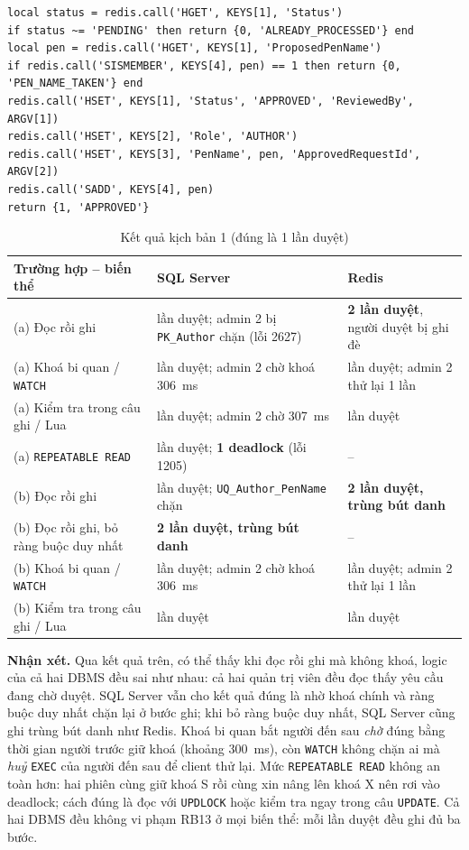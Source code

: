 \begin{verbatim}
local status = redis.call('HGET', KEYS[1], 'Status')
if status ~= 'PENDING' then return {0, 'ALREADY_PROCESSED'} end
local pen = redis.call('HGET', KEYS[1], 'ProposedPenName')
if redis.call('SISMEMBER', KEYS[4], pen) == 1 then return {0, 'PEN_NAME_TAKEN'} end
redis.call('HSET', KEYS[1], 'Status', 'APPROVED', 'ReviewedBy', ARGV[1])
redis.call('HSET', KEYS[2], 'Role', 'AUTHOR')
redis.call('HSET', KEYS[3], 'PenName', pen, 'ApprovedRequestId', ARGV[2])
redis.call('SADD', KEYS[4], pen)
return {1, 'APPROVED'}
\end{verbatim}

\begin{table}[H]
\centering\small
\begin{tabularx}{\textwidth}{|>{\raggedright\arraybackslash}p{4.6cm}|>{\raggedright\arraybackslash}X|>{\raggedright\arraybackslash}X|}
\hline
\textbf{Trường hợp -- biến thể} & \textbf{SQL Server} & \textbf{Redis} \\ \hline
(a) Đọc rồi ghi & 1 lần duyệt; admin 2 bị \texttt{PK\_Author} chặn (lỗi 2627) & \textbf{2 lần duyệt}, người duyệt bị ghi đè \\ \hline
(a) Khoá bi quan / \texttt{WATCH} & 1 lần duyệt; admin 2 chờ khoá 306~ms & 1 lần duyệt; admin 2 thử lại 1 lần \\ \hline
(a) Kiểm tra trong câu ghi / Lua & 1 lần duyệt; admin 2 chờ 307~ms & 1 lần duyệt \\ \hline
(a) \texttt{REPEATABLE READ} & 1 lần duyệt; \textbf{1 deadlock} (lỗi 1205) & -- \\ \hline
(b) Đọc rồi ghi & 1 lần duyệt; \texttt{UQ\_Author\_PenName} chặn & \textbf{2 lần duyệt, trùng bút danh} \\ \hline
(b) Đọc rồi ghi, bỏ ràng buộc duy nhất & \textbf{2 lần duyệt, trùng bút danh} & -- \\ \hline
(b) Khoá bi quan / \texttt{WATCH} & 1 lần duyệt; admin 2 chờ khoá 306~ms & 1 lần duyệt; admin 2 thử lại 1 lần \\ \hline
(b) Kiểm tra trong câu ghi / Lua & 1 lần duyệt & 1 lần duyệt \\ \hline
\end{tabularx}
\caption{Kết quả kịch bản 1 (đúng là 1 lần duyệt)}
\label{tab:tx-t1}
\end{table}

\textbf{Nhận xét.} Qua kết quả trên, có thể thấy khi đọc rồi ghi mà không khoá, logic của cả hai DBMS đều sai như nhau: cả hai quản trị viên đều đọc thấy yêu cầu đang chờ duyệt. SQL Server vẫn cho kết quả đúng là nhờ khoá chính và ràng buộc duy nhất chặn lại ở bước ghi; khi bỏ ràng buộc duy nhất, SQL Server cũng ghi trùng bút danh như Redis. Khoá bi quan bắt người đến sau \emph{chờ} đúng bằng thời gian người trước giữ khoá (khoảng 300~ms), còn \texttt{WATCH} không chặn ai mà \emph{huỷ} \texttt{EXEC} của người đến sau để client thử lại. Mức \texttt{REPEATABLE READ} không an toàn hơn: hai phiên cùng giữ khoá S rồi cùng xin nâng lên khoá X nên rơi vào deadlock; cách đúng là đọc với \texttt{UPDLOCK} hoặc kiểm tra ngay trong câu \texttt{UPDATE}. Cả hai DBMS đều không vi phạm RB13 ở mọi biến thể: mỗi lần duyệt đều ghi đủ ba bước.

